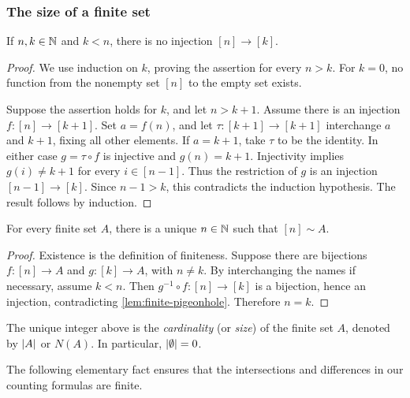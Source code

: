 \documentclass[11pt,a4paper]{amsart}
\begin{document}
\subsubsection{The size of a finite set}

\begin{lemma}\label{lem:finite-pigeonhole}
  If \(n,k\in\mathbb{N}\) and \(k<n\), there is no injection \([n]\to[k]\).
\end{lemma}

\begin{proof}
  We use induction on \(k\), proving the assertion for every \(n>k\).
  For \(k=0\), no function from the nonempty set \([n]\) to the empty
  set exists.

  Suppose the assertion holds for \(k\), and let \(n>k+1\). Assume
  there is an injection \(f\colon[n]\to[k+1]\). Set \(a=f(n)\), and
  let \(\tau\colon[k+1]\to[k+1]\) interchange \(a\) and \(k+1\),
  fixing all other elements. If \(a=k+1\), take \(\tau\) to be the
  identity. In either case \(g=\tau\circ f\) is injective and
  \(g(n)=k+1\). Injectivity implies \(g(i)\neq k+1\) for every
  \(i\in[n-1]\). Thus the restriction of \(g\) is an injection
  \([n-1]\to[k]\). Since \(n-1>k\), this contradicts the induction
  hypothesis. The result follows by induction.
\end{proof}

\begin{theorem}
  For every finite set \(A\), there is a unique \(n\in\mathbb{N}\) such
  that \([n]\sim A\).
\end{theorem}

\begin{proof}
  Existence is the definition of finiteness. Suppose there are
  bijections \(f\colon[n]\to A\) and \(g\colon[k]\to A\), with
  \(n\neq k\). By interchanging the names if necessary, assume
  \(k<n\). Then \(g^{-1}\circ f\colon[n]\to[k]\) is a bijection,
  hence an injection, contradicting \cref{lem:finite-pigeonhole}.
  Therefore \(n=k\).
\end{proof}

\begin{definition}
  The unique integer above is the \emph{cardinality} (or \emph{size})
  of the finite set \(A\), denoted by \(\lvert A\rvert\) or \(N(A)\).
  In particular, \(\lvert\emptyset\rvert=0\).
\end{definition}

The following elementary fact ensures that the intersections and differences
in our counting formulas are finite.
\end{document}
